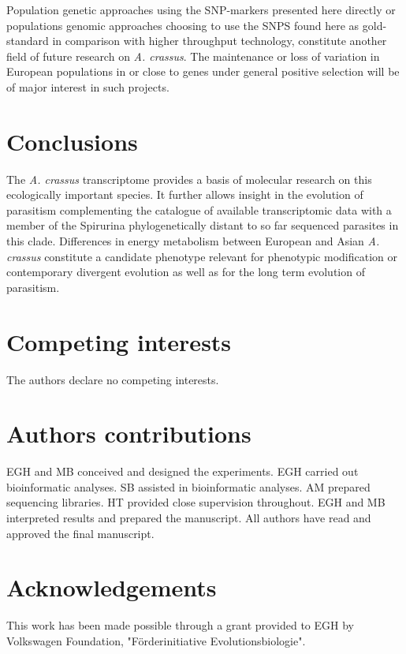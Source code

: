 \documentclass[10pt]{bmc_article}
\newenvironment{bmcformat}{\begin{raggedright}\baselineskip20pt\sloppy\setboolean{publ}{false}}{\end{raggedright}\baselineskip20pt\sloppy}
\begin{document}
\begin{bmcformat}
Population genetic approaches using the SNP-markers presented here
directly or populations genomic approaches choosing to use the SNPS
found here as gold-standard in comparison with higher throughput
technology, constitute another field of future research on
\textit{A. crassus}. The maintenance or loss of variation in European
populations in or close to genes under general positive selection will
be of major interest in such projects.

\section*{Conclusions}

The \textit{A. crassus} transcriptome provides a basis of molecular
research on this ecologically important species. It further allows
insight in the evolution of parasitism complementing the catalogue of
available transcriptomic data with a member of the Spirurina
phylogenetically distant to so far sequenced parasites in this clade.
Differences in energy metabolism between European and Asian
\textit{A. crassus} constitute a candidate phenotype relevant for
phenotypic modification or contemporary divergent evolution as well as
for the long term evolution of parasitism.

\section*{Competing interests}
The authors declare no competing interests.

\section*{Authors contributions}

EGH and MB conceived and designed the experiments. EGH carried out
bioinformatic analyses. SB assisted in bioinformatic analyses. AM
prepared sequencing libraries. HT provided close supervision
throughout. EGH and MB interpreted results and prepared the
manuscript. All authors have read and approved the final manuscript.

\section*{Acknowledgements}

This work has been made possible through a grant provided to EGH by
Volkswagen Foundation, "F\"{o}rderinitiative Evolutionsbiologie".
 

\end{bmcformat}
\end{document}

